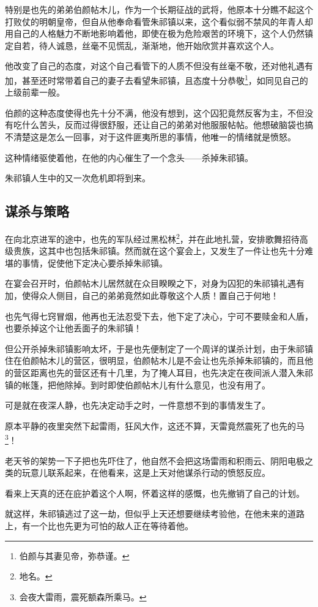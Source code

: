 \begin{multicols}{\theparacolNo}
特别是也先的弟弟伯颜帖木儿，作为一个长期征战的武将，他原本十分瞧不起这个打败仗的明朝皇帝，但自从他奉命看管朱祁镇以来，这个看似弱不禁风的年青人却用自己的人格魅力不断地影响着他，即使在极为危险艰苦的环境下，这个人仍然镇定自若，待人诚恳，丝毫不见慌乱，渐渐地，他开始欣赏并喜欢这个人。

他改变了自己的态度，对这个自己看管下的人质不但没有丝毫不敬，还对他礼遇有加，甚至还时常带着自己的妻子去看望朱祁镇，且态度十分恭敬\footnote{伯颜与其妻见帝，弥恭谨。}，如同见自己的上级前辈一般。

伯颜的这种态度使得也先十分不满，他没有想到，这个囚犯竟然反客为主，不但没有吃什么苦头，反而过得很舒服，还让自己的弟弟对他服服帖帖。他想破脑袋也搞不清楚这是怎么一回事，对于这件匪夷所思的事情，他唯一的情绪就是愤怒。

这种情绪驱使着他，在他的内心催生了一个念头——杀掉朱祁镇。

朱祁镇人生中的又一次危机即将到来。

\subsection{谋杀与策略}
在向北京进军的途中，也先的军队经过黑松林\footnote{地名。}，并在此地扎营，安排歌舞招待高级贵族，这其中也包括朱祁镇。然而就在这个宴会上，又发生了一件让也先十分难堪的事情，促使他下定决心要杀掉朱祁镇。

在宴会召开时，伯颜帖木儿居然就在众目睽睽之下，对身为囚犯的朱祁镇礼遇有加，使得众人侧目，自己的弟弟竟然如此尊敬这个人质！置自己于何地！

也先气得七窍冒烟，他再也无法忍受下去，他下定了决心，宁可不要赎金和人盾，也要杀掉这个让他丢面子的朱祁镇！

但公开杀掉朱祁镇影响太坏，于是也先便制定了一个周详的谋杀计划，由于朱祁镇住在伯颜帖木儿的营区，很明显，伯颜帖木儿是不会让也先杀掉朱祁镇的，而且他的营区距离也先的营区还有十几里，为了掩人耳目，也先决定在夜间派人潜入朱祁镇的帐篷，把他除掉。到时即使伯颜帖木儿有什么意见，也没有用了。

可是就在夜深人静，也先决定动手之时，一件意想不到的事情发生了。

原本平静的夜里突然下起雷雨，狂风大作，这还不算，天雷竟然震死了也先的马\footnote{会夜大雷雨，震死额森所乘马。}！

老天爷的架势一下子把也先吓住了，他自然不会把这场雷雨和积雨云、阴阳电极之类的玩意儿联系起来，在他看来，这是上天对他谋杀行动的愤怒反应。

看来上天真的还在庇护着这个人啊，怀着这样的感慨，也先撤销了自己的计划。

就这样，朱祁镇逃过了这一劫，但似乎上天还想要继续考验他，在他未来的道路上，有一个比也先更为可怕的敌人正在等待着他。


\end{multicols}
